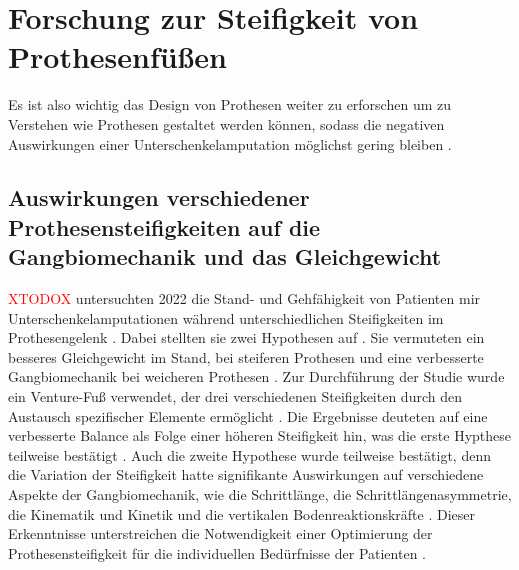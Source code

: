 \section{Forschung zur Steifigkeit von Prothesenfüßen} 
Es ist also wichtig das Design von Prothesen weiter zu erforschen \cite{Major.2014} um zu Verstehen wie Prothesen gestaltet werden können, sodass die negativen Auswirkungen einer Unterschenkelamputation möglichst gering bleiben \cite{Major.2014}.

\subsection{Auswirkungen verschiedener Prothesensteifigkeiten auf die Gangbiomechanik und das Gleichgewicht}
\textcolor{red}{XTODOX} untersuchten 2022 die Stand- und Gehfähigkeit von Patienten mir Unterschenkelamputationen während unterschiedlichen Steifigkeiten im Prothesengelenk \cite{Vaca.2022}. Dabei stellten sie zwei Hypothesen auf \cite{Vaca.2022}. Sie vermuteten ein besseres Gleichgewicht im Stand, bei steiferen Prothesen und eine verbesserte Gangbiomechanik bei weicheren Prothesen \cite{Vaca.2022}. Zur Durchführung der Studie wurde ein Venture-Fuß verwendet, der drei verschiedenen Steifigkeiten durch den Austausch spezifischer Elemente ermöglicht \cite{Vaca.2022}. Die Ergebnisse deuteten auf eine verbesserte Balance als Folge einer höheren Steifigkeit hin, was die erste Hypthese teilweise bestätigt \cite{Vaca.2022}. Auch die zweite Hypothese wurde teilweise bestätigt, denn die Variation der Steifigkeit hatte signifikante Auswirkungen auf verschiedene Aspekte der Gangbiomechanik, wie die Schrittlänge, die Schrittlängenasymmetrie, die Kinematik und Kinetik und die vertikalen Bodenreaktionskräfte \cite{Vaca.2022}. Dieser Erkenntnisse unterstreichen die Notwendigkeit einer Optimierung der Prothesensteifigkeit für die individuellen Bedürfnisse der Patienten \cite{Vaca.2022}.

